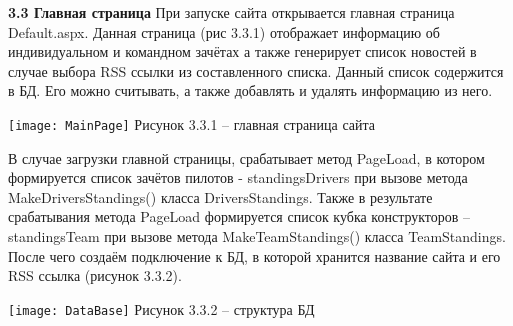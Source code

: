 \documentclass[14pt,a4paper]{extreport}
\begin{document}
	
	
	\textbf{3.3 Главная страница}
\flushleft\parindent=1cm При запуске сайта открывается главная страница Default.aspx. Данная страница (рис 3.3.1) отображает информацию об индивидуальном и командном зачётах а также генерирует список новостей в случае выбора RSS ссылки из составленного списка. Данный список содержится в БД. Его можно считывать, а также добавлять и удалять информацию из него.\par
	\texttt{[image: MainPage]}   
           \center Рисунок 3.3.1 – главная страница сайта\par
           
\flushleft\parindent=1cm В случае загрузки главной страницы, срабатывает метод PageLoad, в котором формируется список зачётов пилотов - standingsDrivers при вызове метода MakeDriversStandings() класса DriversStandings. Также в результате срабатывания метода PageLoad формируется список кубка конструкторов – standingsTeam при вызове метода MakeTeamStandings() класса TeamStandings. После чего создаём подключение к БД, в которой хранится название сайта и его RSS ссылка (рисунок 3.3.2).\par
	\texttt{[image: DataBase]}
           \center Рисунок 3.3.2 – структура БД \par
           
\end{document}
